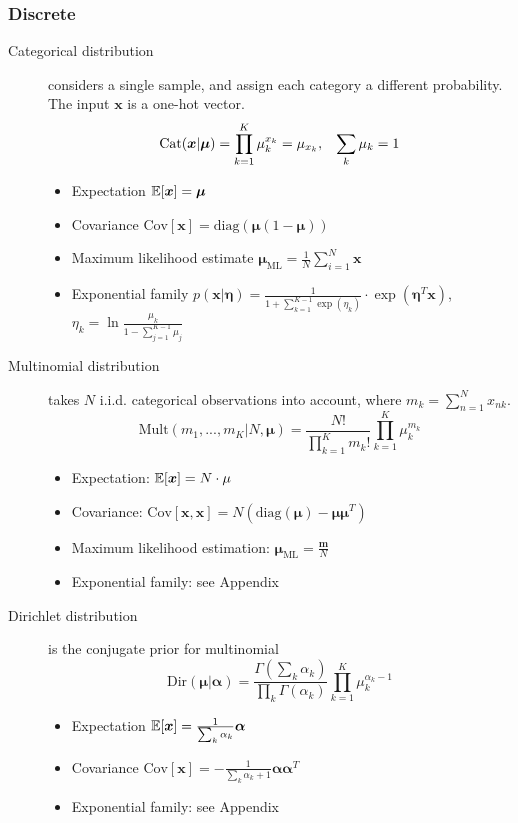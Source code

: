 \subsubsection{Discrete}
\begin{description}
	\item[Categorical distribution] considers a single sample, and assign each category a different probability. The input $\bm{x}$ is a one-hot vector.
	$$\text{Cat}(\bm{x}|\bm{\mu})=\prod_{k=1}^{K}\mu_k^{x_k}=\mu_{x_k}, \hspace{3mm}\sum_k \mu_k = 1$$
	 \begin{itemize}
	 	\item Expectation $\mathbb{E}[\bm{x}]=\bm{\mu}$
	 	\item Covariance $\text{Cov}[\bm{x}]=\text{diag}(\bm{\mu}(1-\bm{\mu}))$
	 	\item Maximum likelihood estimate  $\bm{\mu}_{\text{ML}}=\frac{1}{N}\sum_{i=1}^{N} \bm{x}$
	 	\item Exponential family $p(\bm{x}|\bm{\eta})=\frac{1}{1+\sum_{k=1}^{K-1}\exp(\eta_k)}\cdot \exp(\bm{\eta}^T\bm{x})$, $\eta_k=\ln\frac{\mu_k}{1-\sum_{j=1}^{K-1}\mu_j}$
	 \end{itemize}
	\item[Multinomial distribution] takes $N$ i.i.d. categorical observations into account, where $m_k=\sum_{n=1}^{N} x_{nk}$.
	$$\text{Mult}(m_1,...,m_K|N,\bm{\mu})=\frac{N!}{\prod_{k=1}^{K}m_k!}\prod_{k=1}^{K} \mu_{k}^{m_k}$$
	\begin{itemize}
		\item Expectation: $\mathbb{E}[\bm{x}]=N\cdot \mu$
		\item Covariance: $\text{Cov}[\bm{x},\bm{x}]=N(\text{diag}(\bm{\mu})-\bm{\mu}\bm{\mu}^T)$
		\item Maximum likelihood estimation: $\bm{\mu}_{\text{ML}}=\frac{\bm{m}}{N}$
		\item Exponential family: see Appendix
	\end{itemize}
	\item[Dirichlet distribution] is the conjugate prior for multinomial
	$$\text{Dir}(\bm{\mu}|\bm{\alpha})=\frac{\Gamma(\sum_k \alpha_k)}{\prod_k
	\Gamma(\alpha_k)} \prod_{k=1}^{K}\mu_k^{\alpha_k-1}$$
	\begin{itemize}
		\item Expectation $\mathbb{E}[\bm{x}]=\frac{1}{\sum_k \alpha_k}\bm{\alpha}$
		\item Covariance $\text{Cov}[\bm{x}]=-\frac{1}{\sum_k \alpha_k + 1}\bm{\alpha}\bm{\alpha}^T$
		\item Exponential family: see Appendix
	\end{itemize}
\end{description}
